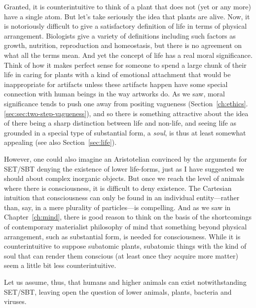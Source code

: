 Granted, it is counterintuitive to think of a plant that does not (yet or any more) have a single atom. But let's take
seriously the idea that plants are alive. Now, it is notoriously difficult to give a satisfactory
definition of life in terms of physical arrangement. Biologists give a variety of definitions including
such factors as growth, nutrition, reproduction and homeostasis, but there is no agreement on what all the
terms mean. And yet the concept of life has a real moral significance. Think of how it makes perfect sense for
someone to spend a large chunk of their life in caring for plants with a kind of emotional attachment that
would be inappropriate for artifacts unless these artifacts happen have some special connection with human beings
in the way artworks do. As we saw, moral significance tends to push one away from positing vagueness (Section~\ref{ch:ethics}.\ref{sec:sec:two-step-vagueness}), and so there is something
attractive about the idea of there being a sharp distinction between life and non-life, and seeing life
as grounded in a special type of substantial form, a \textit{soul}, is thus at least somewhat appealing (see also
Section~\ref{sec:life}).

However, one could also imagine an Aristotelian convinced by the arguments for SET/SBT denying the existence
of lower life-forms, just as I have suggested we should about complex inorganic objects. But once we reach 
the level of animals where there is consciousness, it is difficult to deny existence. The Cartesian intuition
that consciousness can only be found in an individual entity---rather than, say, in a mere plurality of particles---is
compelling. And as we saw in Chapter~\ref{ch:mind}, there is good reason to think on the basis of the shortcomings of 
contemporary materialist philosophy of mind that something beyond physical arrangement, such as substantial form, 
is needed for consciousness. While it is counterintuitive to suppose subatomic plants, subatomic things with the
kind of soul that can render them conscious (at least once they acquire more matter) seem a little bit less 
counterintuitive.

Let us assume, thus, that humans and higher animals can exist notwithstanding SET/SBT, leaving open the question
of lower animals, plants, bacteria and viruses. 

